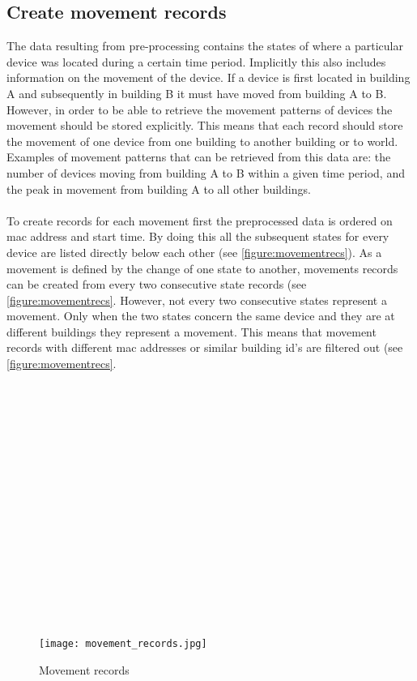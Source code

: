 \subsection{Create movement records}

The data resulting from pre-processing contains the states of where a particular device was located during a certain time period. Implicitly this also includes information on the movement of the device. If a device is first located in building A and subsequently in building B it must have moved from building A to B. However, in order to be able to retrieve the movement patterns of devices the movement should be stored explicitly. This means that each record should store the movement of one device from one building to another building or to world. Examples of movement patterns that can be retrieved from this data are: the number of devices moving from building A to B within a given time period, and the peak in movement from building A to all other buildings. 
\\\\
To create records for each movement first the preprocessed data is ordered on mac address and start time. By doing this all the subsequent states for every device are listed directly below each other (see \autoref{figure:movementrecs}). As a movement is defined by the change of one state to another, movements records can be created from every two consecutive state records (see \autoref{figure:movementrecs}. However, not every two consecutive states represent a movement. Only when the two states concern the same device and they are at different buildings they represent a movement. This means that movement records with different mac addresses or similar building id’s are filtered out (see \autoref{figure:movementrecs}.\\
\\\\
\\\\
\\\\
\\\\
\\\\
\\\\
\\\\
\\\\

\begin{figure}[H]
\centering
\texttt{[image: movement\_records.jpg]}
\captionsetup{justification=centering}
\caption{Movement records}
\label{figure:movementrecs}
\end{figure}

